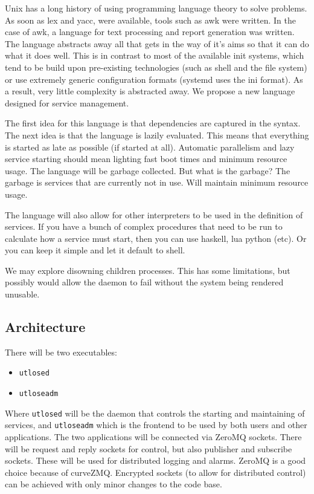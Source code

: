 \documentclass{article}
\begin{document}
Unix has a long history of using programming language theory to solve problems. As soon as
lex and yacc, were available, tools such as awk were written. In the case of awk, a language
for text processing and report generation was written. The language abstracts away all that
gets in the way of it's aims so that it can do what it does well. This is in contrast to most
of the available init systems, which tend to be build upon pre-existing technologies (such
as shell and the file system) or use extremely generic configuration formats (systemd uses
the ini format). As a result, very little complexity is abstracted away. We propose a
new language designed for service management.

The first idea for this language is that dependencies are captured in the syntax. The next idea
is that the language is lazily evaluated. This means that everything is started as late as possible
(if started at all). Automatic parallelism and lazy service starting should mean lighting fast
boot times and minimum resource usage. The language will be garbage collected. But what is
the garbage? The garbage is services that are currently not in use. Will maintain minimum
resource usage.

The language will also allow for other interpreters to be used in the definition of
services. If you have a bunch of complex procedures that need to be run to calculate how a service
must start, then you can use haskell, lua python (etc). Or you can keep it simple and let it
default to shell.

We may explore disowning children processes. This has some limitations, but possibly would allow
the daemon to fail without the system being rendered unusable.

\subsection{Architecture}
There will be two executables:
\begin{itemize}
  \item \texttt{utlosed}
  \item \texttt{utloseadm}
\end{itemize}
Where \texttt{utlosed} will be the daemon that controls the starting and maintaining of services, and
\texttt{utloseadm} which is the frontend to be used by both users and other applications.
The two applications will be connected via ZeroMQ sockets. There will be request and reply sockets
for control, but also publisher and subscribe sockets. These will be used for distributed logging and alarms.
ZeroMQ is a good choice because of curveZMQ. Encrypted sockets (to allow for distributed control)
can be achieved with only minor changes to the code base.
\end{document}
